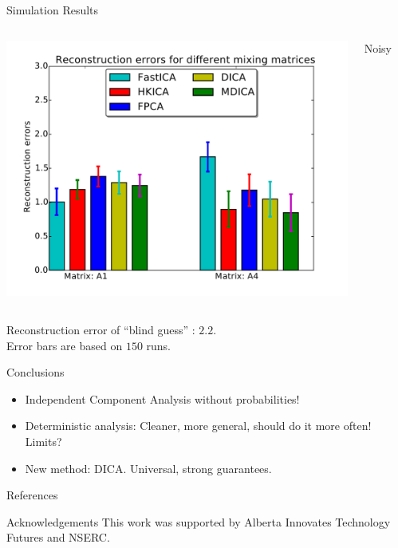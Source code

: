 \documentclass[final]{beamer} %
\newcommand{\bc}{\begin{center}}
\newcommand{\ec}{\end{center}}
\begin{document}
\begin{frame}[c]
\begin{columns}[t,totalwidth=\textwidth]
\begin{column}{0.32\textwidth}
\begin{block}{Simulation Results}
\begin{columns}[t]
			\includegraphics[width=\textwidth]{barchart-A1vsA4-noisy}
			\bc
			Noisy
			\ec
			\end{columns}		
			\bc
			Reconstruction error of ``blind guess'' : $2.2$.\\
			Error bars are based on $150$ runs.
			\ec
		\end{block}
		\vspace{0.5ex}
		\bigskip
		\bigskip
		\begin{block}{Conclusions}
			\begin{itemize}
			\item Independent Component Analysis without probabilities! 
			\item Deterministic analysis: Cleaner, more general, should do it more often! Limits?
			\item New method: DICA. Universal, strong guarantees.
			\end{itemize}
		\end{block}		
		\vspace{0.5ex}
		\bigskip
		\bigskip
		\begin{block}{References}
			\tiny
			
			
		\end{block}
		\vspace{0.5ex}
		\bigskip
		\bigskip
		\begin{block}{Acknowledgements}
			\small
			This work was supported by Alberta Innovates Technology Futures and NSERC.
		\end{block}
	\end{column}
		
	\begin{column}{0.01\textwidth}
	\end{column}
\end{columns}
 
\end{frame}
\end{document}
